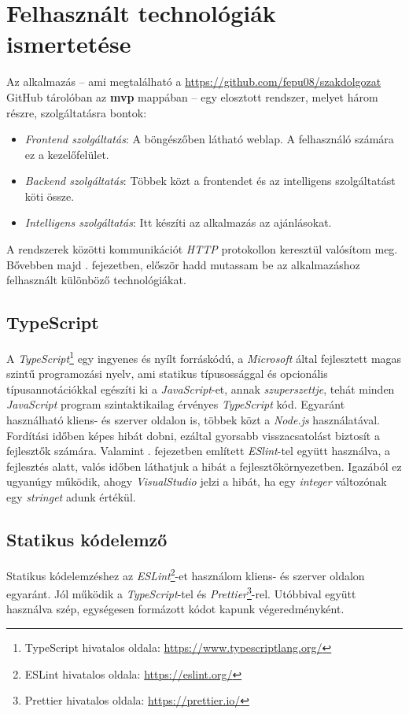 \documentclass[
]{thesis-ekf}
\theoremstyle{definition}
\theoremstyle{remark}
\begin{document}
\chapter{Felhasznált technológiák ismertetése}
Az alkalmazás -- ami megtalálható a \url{https://github.com/fepu08/szakdolgozat} GitHub tárolóban az \textbf{mvp} mappában -- egy elosztott rendszer, melyet három részre, szolgáltatásra bontok: 
\begin{itemize}
	\item \emph{Frontend szolgáltatás}:  A böngészőben látható weblap. A felhasználó számára ez a kezelőfelület.
	\item \emph{Backend szolgáltatás}: Többek közt a frontendet és az intelligens szolgáltatást köti össze.
	\item \emph{Intelligens szolgáltatás}: Itt készíti az alkalmazás az ajánlásokat.
\end{itemize}
A rendszerek közötti kommunikációt \emph{HTTP} protokollon keresztül valósítom meg. Bővebben majd . fejezetben, először hadd mutassam be az alkalmazáshoz felhasznált különböző technológiákat. 

\section{TypeScript}
A \emph{TypeScript}\footnote{TypeScript hivatalos oldala: \url{https://www.typescriptlang.org/}} egy ingyenes és nyílt forráskódú, a \emph{Microsoft} által fejlesztett magas szintű programozási nyelv, ami statikus típusossággal és opcionális típusannotációkkal egészíti ki a \emph{JavaScript}-et, annak \emph{szuperszettje}, tehát minden \emph{JavaScript} program szintaktikailag érvényes \emph{TypeScript} kód. Egyaránt használható kliens- és szerver oldalon is, többek közt a \emph{Node.js} használatával.\cite{wiki-ts} Fordítási időben képes hibát dobni, ezáltal gyorsabb visszacsatolást biztosít a fejlesztők számára. Valamint . fejezetben említett \emph{ESlint}-tel együtt használva, a fejlesztés alatt, valós időben láthatjuk a hibát a fejlesztőkörnyezetben. Igazából ez ugyanúgy működik, ahogy \emph{VisualStudio} jelzi a hibát, ha egy \emph{integer} változónak egy \emph{stringet} adunk értékül.

\section{Statikus kódelemző}
\label{sec-statikus-kodelemzo}
Statikus kódelemzéshez az \emph{ESLint}\footnote{ESLint hivatalos oldala: \url{https://eslint.org/}}-et használom kliens- és szerver oldalon egyaránt. Jól működik a \emph{TypeScript}-tel és \emph{Prettier}\footnote{Prettier hivatalos oldala: \url{https://prettier.io/}}-rel. Utóbbival együtt használva szép, egységesen formázott kódot kapunk végeredményként.
\end{document}

